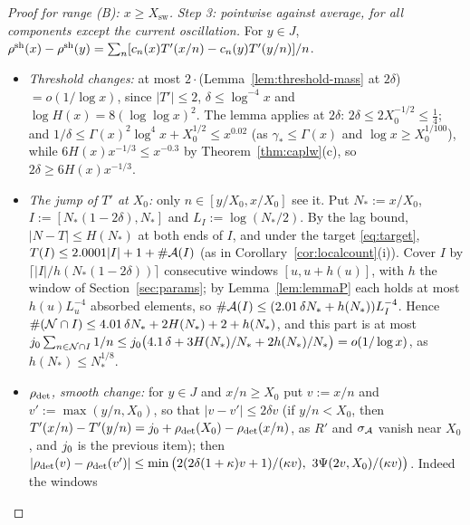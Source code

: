 \begin{proof}[Proof for range \textup{(B)}: $x\ge X_{\mathrm{sw}}$]
\emph{Step 3: pointwise against average, for all components except the current oscillation.} For $y\in J$,
$\rho^{\mathrm{sh}}(x)-\rho^{\mathrm{sh}}(y)=\sum_n[c_n(x)T'(x/n)-c_n(y)T'(y/n)]/n$.
\begin{itemize}
\item \emph{Threshold changes:} at most $2\cdot$(Lemma~\ref{lem:threshold-mass} at $2\delta$) $=o(1/\log x)$, since $|T'|\le2$,
  $\delta\le\log^{-4}x$ and $\log H(x)=8(\log\log x)^2$.
  The lemma applies at $2\delta$: $2\delta\le2X_0^{-1/2}\le\frac14$; and $1/\delta\le\Gamma(x)^2\log^4x+X_0^{1/2}\le x^{0.02}$ (as
  $\gamma_*\le\Gamma(x)$ and $\log x\ge X_0^{1/100}$), while $6H(x)x^{-1/3}\le x^{-0.3}$ by Theorem~\ref{thm:caplw}(c), so
  $2\delta\ge6H(x)x^{-1/3}$.
\item \emph{The jump of $T'$ at $X_0$:} only $n\in[y/X_0,x/X_0]$ see it. Put $N_*:=x/X_0$, $I:=[N_*(1-2\delta),N_*]$ and
  $L_I:=\log(N_*/2)$. By the lag bound,
$|N-T|\le H(N_*)$ at both ends of $I$, and under the target \eqref{eq:target},
  $T(I)\le2.0001|I|+1+\#\mathcal{A}(I)$ (as in Corollary~\ref{cor:localcount}(i)). Cover $I$ by $\lceil|I|/h(N_*(1-2\delta))\rceil$ consecutive windows $[u,u+h(u)]$,
  with $h$ the window of Section~\ref{sec:params}; by Lemma~\ref{lem:lemmaP} each holds at most $h(u)L_u^{-4}$ absorbed elements, so
  $\#\mathcal{A}(I)\le(2.01\,\delta N_*+h(N_*))L_I^{-4}$. Hence $\#(\mathcal{N}\cap I)\le4.01\,\delta N_*+2H(N_*)+2+h(N_*)$, and
  this part is at most $j_0\sum_{n\in\mathcal{N}\cap I}1/n\le j_0\big(4.1\,\delta+3H(N_*)/N_*+2h(N_*)/N_*\big)=o(1/\log x)$, as $h(N_*)\le N_*^{1/8}$.
\item \emph{$\rho_{\mathrm{det}}$, smooth change:} for $y\in J$ and $x/n\ge X_0$ put $v:=x/n$ and $v':=\max(y/n,X_0)$, so that $|v-v'|\le2\delta v$
  (if $y/n<X_0$, then $T'(x/n)-T'(y/n)=j_0+\rho_{\mathrm{det}}(X_0)-\rho_{\mathrm{det}}(x/n)$, as $R'$ and $\sigma_{\mathcal{A}}$ vanish near $X_0$, and $j_0$ is
  the previous item); then
  $|\rho_{\mathrm{det}}(v)-\rho_{\mathrm{det}}(v')|\le\min\big(2(2\delta(1+\kappa)v+1)/(\kappa v),\ 3\Psi(2v,X_0)/(\kappa v)\big)$. Indeed the windows

\end{itemize}
\end{proof}

